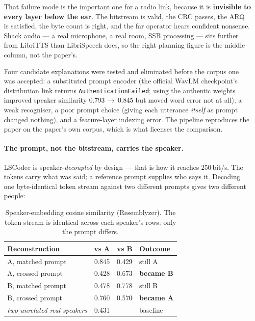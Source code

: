 That failure mode is the important one for a radio link, because it is
\textbf{invisible to every layer below the ear}.  The bitstream is
valid, the CRC passes, the ARQ is satisfied, the byte count is right,
and the far operator hears confident nonsense.  Shack audio --- a real
microphone, a real room, SSB processing --- sits further from LibriTTS
than LibriSpeech does, so the right planning figure is the middle
column, not the paper's.

Four candidate explanations were tested and eliminated before the
corpus one was accepted: a substituted prompt encoder (the official
WavLM checkpoint's distribution link returns
\texttt{AuthenticationFailed}; using the authentic weights improved
speaker similarity 0.793\,$\rightarrow$\,0.845 but moved word error not
at all), a weak recogniser, a poor prompt choice (giving each utterance
\emph{itself} as prompt changed nothing), and a feature-layer indexing
error.  The pipeline reproduces the paper on the paper's own corpus,
which is what licenses the comparison.

\paragraph{The prompt, not the bitstream, carries the speaker.}
LSCodec is speaker-\emph{decoupled} by design --- that is how it
reaches 250\,bit/s.  The tokens carry what was said; a reference prompt
supplies who says it.  Decoding one byte-identical token stream against
two different prompts gives two different people:

\begin{table}[H]
    \centering
    \caption{Speaker-embedding cosine similarity (Resemblyzer).  The
             token stream is identical across each speaker's rows; only
             the prompt differs.}
    \label{tab:voice_identity}
    \small
    \begin{tabular}{@{}lrrl@{}}
    \toprule
    \textbf{Reconstruction} & \textbf{vs A} & \textbf{vs B} &
    \textbf{Outcome} \\
    \midrule
    A, matched prompt & 0.845 & 0.429 & still A \\
    A, crossed prompt & 0.428 & 0.673 & \textbf{became B} \\
    B, matched prompt & 0.478 & 0.778 & still B \\
    B, crossed prompt & 0.760 & 0.570 & \textbf{became A} \\
    \midrule
    \emph{two unrelated real speakers} & 0.431 & --- & baseline \\
    \bottomrule
    \end{tabular}
\end{table}

